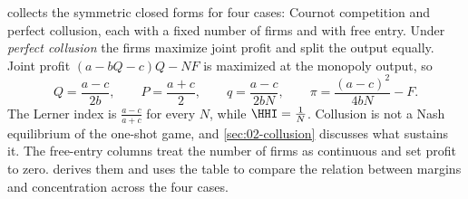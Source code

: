  collects the symmetric closed forms for four cases: Cournot competition and perfect
collusion, each with a fixed number of firms and with free entry. Under \emph{perfect collusion} the firms maximize
joint profit and split the output equally. Joint profit $(a - bQ - c)Q - NF$ is maximized at the monopoly output, so
\[
  Q = \frac{a - c}{2b}, \qquad P = \frac{a + c}{2}, \qquad q = \frac{a - c}{2bN}, \qquad
  \pi = \frac{(a - c)^2}{4bN} - F .
\]
The Lerner index is $\frac{a - c}{a + c}$ for every $N$, while $\HHI = \frac{1}{N}$. Collusion is not a Nash
equilibrium of the one-shot game, and \cref{sec:02-collusion} discusses what sustains it. The free-entry columns
treat the number of firms as continuous and set profit to zero.  derives them and uses the table
to compare the relation between margins and concentration across the four cases.

